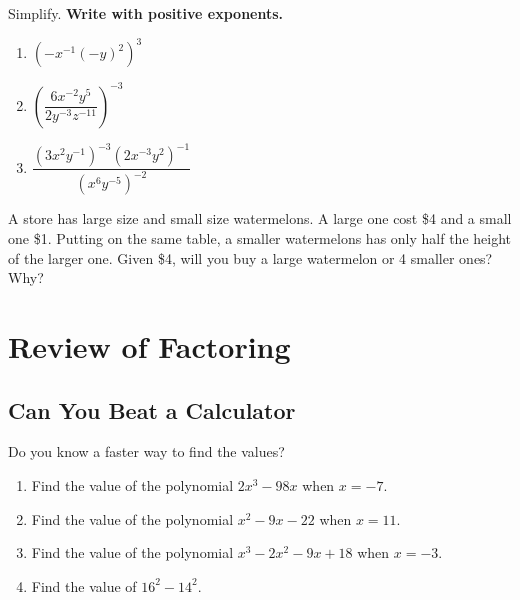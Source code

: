 \documentclass[en,11pt]{elegantbook}
\newcommand{\size}[2]{{\fontsize{#1}{0}\selectfont#2}}
\newenvironment{rmdthink}{
	\vspace*{0.5\baselineskip}
	\par\noindent
	\makebox[-4pt][r]{\color{green!90}\size{12}{\faLightbulbO}\,\,}
    \begin{tcolorbox}[
    enhanced,
    title={\textbf{\color{second}Think}},
    title style={left color=blue!10!green!20!white,right color=yellow!20!blue!20!white},
    colback=green!20!white,
    ]
    \sffamily
}{
    \end{tcolorbox}
	\par\ignorespacesafterend
}
\let\BeginKnitrBlock\begin \let\EndKnitrBlock\end
\begin{document}
\BeginKnitrBlock{exercise}
\protect\hypertarget{exr:unnamed-chunk-6}{}{\label{exr:unnamed-chunk-6} }
Simplify. \textbf{Write with positive exponents.}

\begin{enumerate}
\def\labelenumi{\arabic{enumi}.}

\item
  \(\left(-x^{-1}(-y)^2\right)^3\)
\item
  \(\left(\dfrac{6x^{-2}y^5}{2y^{-3}z^{-11}}\right)^{-3}\)
\item
  \(\dfrac{(3 x^{2} y^{-1})^{-3}(2 x^{-3} y^{2})^{-1}}{(x^{6} y^{-5})^{-2}}\)
\end{enumerate}
\EndKnitrBlock{exercise}

\BeginKnitrBlock{exercise}
\protect\hypertarget{exr:unnamed-chunk-7}{}{\label{exr:unnamed-chunk-7} }
A store has large size and small size watermelons. A large one cost \$4 and a small one \$1. Putting on the same table, a smaller watermelons has only half the height of the larger one. Given \$4, will you buy a large watermelon or 4 smaller ones? Why?
\EndKnitrBlock{exercise}

\hypertarget{review-of-factoring}{%
\chapter{Review of Factoring}\label{review-of-factoring}}

\hypertarget{can-you-beat-a-calculator}{%
\section{Can You Beat a Calculator}\label{can-you-beat-a-calculator}}

\begin{rmdthink}

Do you know a faster way to find the values?

\begin{enumerate}
\def\labelenumi{\arabic{enumi}.}

\item
  Find the value of the polynomial \(2x^3-98x\) when \(x=-7\).
\item
  Find the value of the polynomial \(x^2-9x-22\) when \(x=11\).
\item
  Find the value of the polynomial \(x^3-2x^2-9x+18\) when \(x=-3\).
\item
  Find the value of \(16^2-14^2\).
\end{enumerate}

\end{rmdthink}
\end{document}
